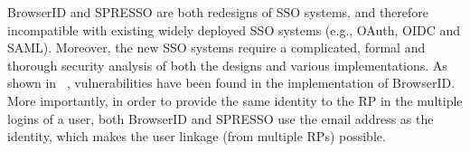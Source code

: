 
BrowserID and SPRESSO are both redesigns of SSO systems, and therefore incompatible with existing widely deployed SSO systems (e.g., OAuth, OIDC and SAML). Moreover, the new SSO systems require a  complicated, formal and thorough security analysis of both the designs and various implementations. As shown in ~\cite{BrowserID}, vulnerabilities have been found in the implementation of BrowserID. More importantly,  in order to provide the same identity to the RP in the multiple logins of a user, both BrowserID and SPRESSO use the email address as the identity, which makes the user linkage (from multiple RPs) possible.



